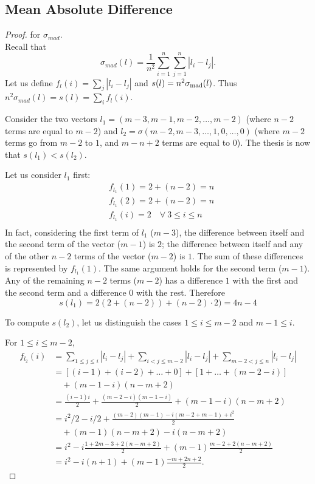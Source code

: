 \documentclass[version=3.21, pagesize, twoside=off, bibliography=totoc, DIV=calc, fontsize=12pt, a4paper]{scrartcl}
\begin{document}
\subsection{Mean Absolute Difference}
\begin{proof} for $\sigma_{mad}$. \\
	Recall that 
	\[\sigma_{mad}(l)= \frac{1}{n^2} \sum_{i=1}^{n}\sum_{j=1}^{n}|l_i-l_j|.\]
	Let us define $f_l(i)= \sum_{j}|l_i-l_j|$ and $s(l) = n^2 \sigma_\text{mad}(l)$. Thus $n^2 \sigma_{mad}(l) = s(l)= \sum_{i} f_l(i)$.
	
	Consider the two vectors $l_1=(m-3, m-1, m-2, \dots, m-2)$ (where $n-2$ terms are equal to $m-2$) and $l_2=\sigma(m-2, m-3, \dots, 1, 0, \dots, 0)$ (where $m-2$ terms go from $m-2$ to $1$, and $m-n+2$ terms are equal to $0$). 
	The thesis is now that $s(l_1) < s(l_2)$.
	
	Let us consider $l_1$ first: 
	\begin{align}
		&f_{l_1}(1)= 2+(n-2)=n \\
		&f_{l_1}(2)= 2+(n-2)=n \\
		&f_{l_1}(i)= 2 \quad \forall \ 3\leq i \leq n \\ 
	\end{align}
	In fact, considering the first term of $l_1$ ($m-3$), the difference between itself and the second term of the vector ($m-1$) is $2$; the difference between itself and any of the other $n-2$ terms of the vector ($m-2$) is $1$. The sum of these differences is represented by $f_{l_1}(1)$. The same argument holds for the second term ($m-1$). Any of the remaining $n-2$ terms ($m-2$) has a difference $1$ with the first and the second term and a difference $0$ with the rest. Therefore 
	\[s(l_1) =2(2+(n-2))+(n-2)\cdot2)= 4n-4\]
	
	To compute $s(l_2)$, let us distinguish the cases $1 ≤ i ≤ m - 2$ and $m - 1 ≤ i$.
	
	For $1 ≤ i ≤ m - 2$, 
	\begin{align}
		f_{l_2}(i) &= \sum_{1 ≤ j ≤ i} |l_i - l_j| + \sum_{i < j ≤ m - 2} |l_i - l_j| + \sum_{m - 2 < j ≤ n} |l_i - l_j|\\
		&= [(i - 1) + (i - 2) + … + 0] + [1 + … + (m - 2 - i)] \\
		&\quad + (m - 1 - i) (n - m + 2)\\
		&= \frac{(i - 1) i}{2} + \frac{(m - 2 - i) (m - 1 - i)}{2} + (m - 1 - i) (n - m + 2)\\
		&= i^2 / 2 - i / 2 + \frac{(m - 2) (m - 1) - i (m - 2 + m - 1) + i^2}{2} \\
		&\quad + (m - 1) (n - m + 2) - i (n - m + 2)\\
		&= i^2 - i \frac{1 + 2m - 3 + 2(n - m + 2)}{2} + (m - 1) \frac{m - 2 + 2 (n - m + 2)}{2}\\
		&= i^2 - i (n + 1) + (m - 1) \frac{-m + 2n + 2}{2}.
	\end{align}
	

\end{proof}
\end{document}
